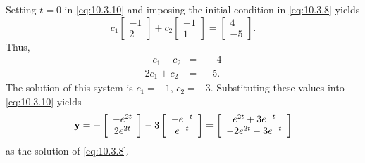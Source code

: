 \begin{examplesolution}
 Setting $t=0$ in \eqref{eq:10.3.10} and imposing the initial condition in
\eqref{eq:10.3.8} yields
\[
  c_{1}\left[
  \begin{array}{r}
    -1 \\
    2
  \end{array}\right]+c_{2}\left[
  \begin{array}{r}
    -1 \\
    1
  \end{array}\right]= \left[
  \begin{array}{r}
    4  \\
    -5
  \end{array}\right].
\]
Thus,
\begin{eqnarray*}
  -c_{1}-c_{2} & = & \phantom{-}4 \\
  2c_{1}+c_{2} & = & -5.
\end{eqnarray*}
The solution of this system is $c_{1}=-1$, $c_{2}=-3$. Substituting these values into
\eqref{eq:10.3.10} yields
\[
  {\bf y}=-\left[
  \begin{array}{c}
    -e^{2t} \\
    2e^{2t}
  \end{array}
  \right]-3 \left[
  \begin{array}{c}
    -e^{-t} \\
    e^{-t}
  \end{array}\right]= \left[
  \begin{array}{c}
    e^{2t}+3e^{-t}   \\
    -2e^{2t}-3e^{-t}
  \end{array}\right]
\]
as the solution of \eqref{eq:10.3.8}.
\end{examplesolution}

\enlargethispage{1in}
\exercises


